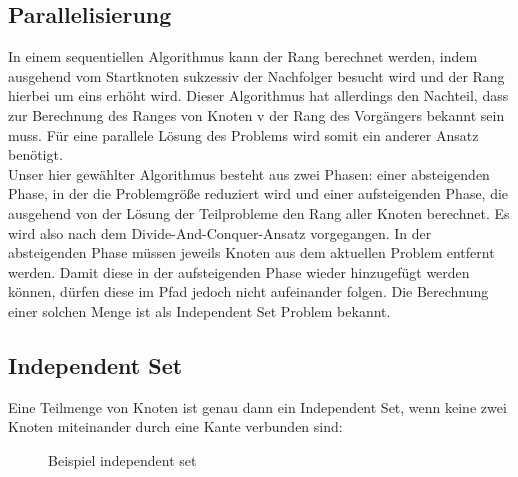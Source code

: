 \documentclass[a0,portrait]{a0poster}
\begin{document}
\begin{multicols}{2}
\subsection*{Parallelisierung}

In einem sequentiellen Algorithmus kann der Rang berechnet werden, indem ausgehend vom Startknoten
sukzessiv der Nachfolger besucht wird und der Rang hierbei um eins erhöht wird. Dieser Algorithmus 
hat allerdings den Nachteil, dass zur Berechnung des Ranges von Knoten v der Rang des Vorgängers 
bekannt sein muss. Für eine parallele Lösung des Problems wird somit ein anderer Ansatz benötigt.\\
Unser hier gewählter Algorithmus besteht aus zwei Phasen: einer absteigenden Phase, in der die 
Problemgröße reduziert wird und einer aufsteigenden Phase, die ausgehend von der Lösung der 
Teilprobleme den Rang aller Knoten berechnet. Es wird also nach dem Divide-And-Conquer-Ansatz 
vorgegangen. In der absteigenden Phase müssen jeweils Knoten aus dem aktuellen Problem entfernt 
werden. Damit diese in der aufsteigenden Phase wieder hinzugefügt werden können, dürfen diese im 
Pfad jedoch nicht aufeinander folgen. Die Berechnung einer solchen Menge ist als Independent Set Problem bekannt.

\subsection*{Independent Set}

Eine Teilmenge von Knoten ist genau dann ein Independent Set, wenn keine zwei Knoten miteinander durch eine Kante verbunden sind:

\begin{figure}[H]
\caption{Beispiel independent set}
\label{islist}
\end{figure}


\end{multicols}
\end{document}
